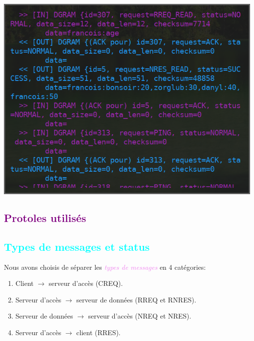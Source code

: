 \documentclass[a4paper]{article}
\newcommand{\ra}{\rightarrow}
\let\oldsection\section{}
\renewcommand{\section}[1]{\textcolor{purple}{\oldsection{#1}}}
\let\oldsubsection\subsection{}
\renewcommand{\subsection}[1]{\textcolor{cyan}{\oldsubsection{#1}}}
\let\oldtextit\textit
\renewcommand{\textit}[1]{\textcolor{violet}{\oldtextit{#1}}}
\begin{document}
\begin{center}
    \includegraphics[scale=0.4]{img/debug.png}
\end{center}

\section{Protoles utilisés}

\subsection{Types de messages et status}

Nous avons choisis de séparer les \textit{types de messages} en 4 catégories:
\begin{enumerate}
    \item Client $\ra$ serveur d'accès (CREQ).
    \item Serveur d'accès $\ra$ serveur de données (RREQ et RNRES).
    \item Serveur de données $\ra$ serveur d'accès (NREQ et NRES).
    \item Serveur d'accès $\ra$ client (RRES).
\end{enumerate}
\end{document}
